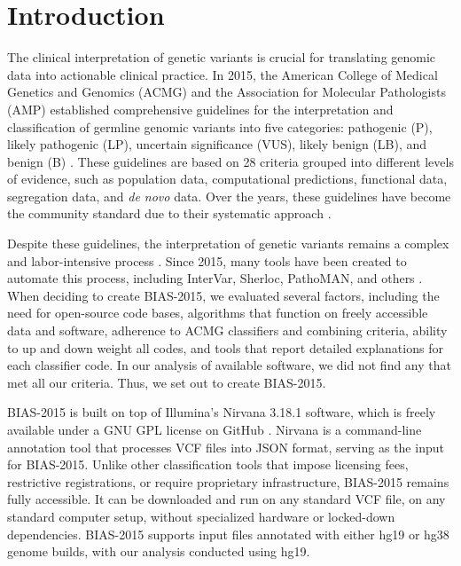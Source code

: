 \documentclass[unnumsec,webpdf,contemporary,large]{oup-authoring-template}
\theoremstyle{thmstyleone}
\theoremstyle{thmstyletwo}
\theoremstyle{thmstylethree}
\begin{document}
\section{Introduction}
The clinical interpretation of genetic variants is crucial for translating genomic data into actionable clinical practice. In 2015, the American College of Medical Genetics and Genomics (ACMG) and the Association for Molecular Pathologists (AMP) established comprehensive guidelines for the interpretation and classification of germline genomic variants into five categories: pathogenic (P), likely pathogenic (LP), uncertain significance (VUS), likely benign (LB), and benign (B) \cite{richards2015standards}. These guidelines are based on 28 criteria grouped into different levels of evidence, such as population data, computational predictions, functional data, segregation data, and \textit{de novo} data. Over the years, these guidelines have become the community standard due to their systematic approach \cite{amendola2016performance}.

Despite these guidelines, the interpretation of genetic variants remains a complex and labor-intensive process \cite{biesecker2018reputable, brnich2019recommendations}
. Since 2015, many tools have been created to automate this process, including InterVar, Sherloc, PathoMAN, and others \cite{li2017intervar, nykamp2017sherloc, ravichandran2019automation}. When deciding to create BIAS-2015, we evaluated several factors, including the need for open-source code bases, algorithms that function on freely accessible data and software, adherence to ACMG classifiers and combining criteria, ability to up and down weight all codes, and tools that report detailed explanations for each classifier code. In our analysis of available software, we did not find any that met all our criteria. Thus, we set out to create BIAS-2015.

BIAS-2015 is built on top of Illumina’s Nirvana 3.18.1 software, which is freely available under a GNU GPL license on GitHub \cite{stromberg2017nirvana}. Nirvana is a command-line annotation tool that processes VCF files into JSON format, serving as the input for BIAS-2015. Unlike other classification tools that impose licensing fees, restrictive registrations, or require proprietary infrastructure, BIAS-2015 remains fully accessible. It can be downloaded and run on any standard VCF file, on any standard computer setup, without specialized hardware or locked-down dependencies. BIAS-2015 supports input files annotated with either hg19 or hg38 genome builds, with our analysis conducted using hg19.
\end{document}
